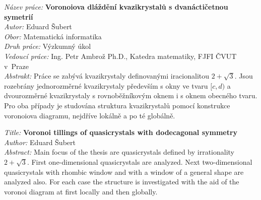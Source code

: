 \documentclass[a4paper,10pt,twoside]{article}
\theoremstyle{definition}
\theoremstyle{remark}
\begin{document}

\cleardoublepage

{
\setlength{\parindent}{0pt}

\textit{Název práce:}
\textbf{Voronoiova dláždění kvazikrystalů s dvanáctičetnou symetrií} \\

\textit{Autor:} Eduard Šubert \\

\textit{Obor:} Matematická informatika \\

\textit{Druh práce:} Výzkumný úkol \\

\textit{Vedoucí práce:}  Ing. Petr Ambrož Ph.D., Katedra matematiky, FJFI ČVUT v~Praze \\

\textit{Abstrakt:} 
Práce se zabývá kvazikrystaly definovanými iracionalitou $2+\sqrt{3}$. Jsou rozebrány jednorozměrné kvazikrystaly především s okny ve tvaru $[c,d)$ a dvourozměrné kvazikrystaly s rovnoběžníkovým oknem i s oknem obecného tvaru. Pro oba případy je studována struktura kvazikrystalů pomocí konstrukce voronoiova diagramu, nejdříve lokálně a po té globálně. \\

\vspace{1.5cm}

\textit{Title:}
\textbf{Voronoi tillings of quasicrystals with dodecagonal symmetry} \\

\textit{Author:} Eduard Šubert\\

\textit{Abstract:} 
Main focus of the thesis are quasicrystals defined by irrationality $2+\sqrt{3}$. First one-dimensional quasicrystals are analyzed. Next two-dimensional quasicrystals with rhombic window and with a window of a general shape are analyzed also. For each case the structure is investigated with the aid of the voronoi diagram at first locally and then globally. \\

}


\cleardoublepage

\tableofcontents
\setcounter{page}{1}
\cleardoublepage
\end{document}
